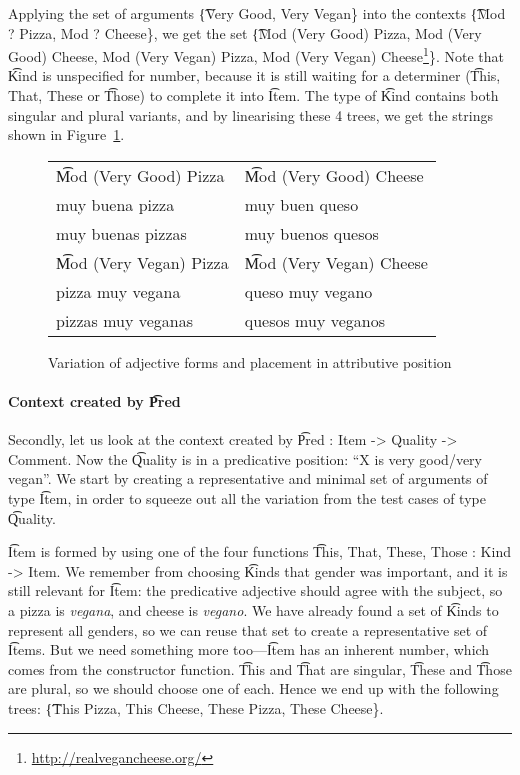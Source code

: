 Applying the set of arguments \t{\{Very Good, Very Vegan\}} into the
contexts \t{\{Mod ? Pizza, Mod ? Cheese\}}, we get the set \t{\{Mod
  (Very Good) Pizza, Mod (Very Good) Cheese, Mod (Very Vegan) Pizza,
  Mod (Very Vegan)
  Cheese\footnote{\url{http://realvegancheese.org/}}\}}. Note that
\t{Kind} is unspecified for number, because it is still waiting for a
determiner (\t{This, That, These} or \t{Those}) to complete it into
\t{Item}. The type of \t{Kind} contains both singular and plural
variants, and by linearising these 4 trees, we get the strings shown
in Figure~\ref{fig:veganCheese}.

\begin{figure}
\centering
\begin{tabular}{| l | l |}
\hline
\t{Mod (Very Good) Pizza}   & \t{Mod (Very Good) Cheese} \\ 
muy buena pizza             & muy buen queso \\
muy buenas pizzas           & muy buenos quesos \\ \hline

\t{Mod (Very Vegan) Pizza}  & \t{Mod (Very Vegan) Cheese} \\
pizza muy vegana            & queso muy vegano \\
pizzas muy veganas          & quesos muy veganos \\ \hline
\end{tabular}
\caption{Variation of adjective forms and placement in attributive position}
\label{fig:veganCheese}
\end{figure}

\paragraph{Context created by \t{Pred}} 
Secondly, let us look at the context created by \t{Pred : Item ->
  Quality -> Comment}. Now the \t{Quality} is in a predicative
position: ``X is very good/very vegan''. We start by creating a
representative and minimal set of arguments of type \t{Item}, in order
to squeeze out all the variation from the test cases of type
\t{Quality}.

\t{Item} is formed by using one of the four functions \t{This, That, These, Those : Kind -> Item}.
We remember from choosing \t{Kind}s that gender was important, and it
is still relevant for \t{Item}: the predicative adjective should agree
with the subject, so a pizza is \emph{vegana}, and cheese is
\emph{vegano}. We have already found a set of \t{Kind}s to represent
all genders, so we can reuse that set to create a representative set
of \t{Item}s. But we need something more too---\t{Item} has an
inherent number, which comes from the constructor function. \t{This}
and \t{That} are singular, \t{These} and \t{Those} are plural, so we
should choose one of each. Hence we end up with the following trees:
\t{\{This Pizza, This Cheese, These Pizza, These Cheese\}}. 

